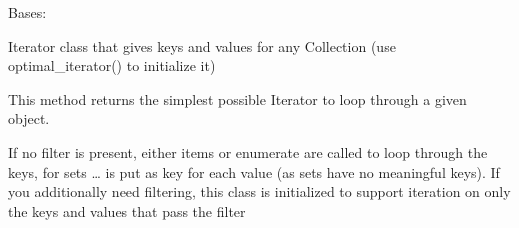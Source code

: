 \documentclass[a4paper,10pt,english]{sphinxmanual}
\begin{document}
\begin{fulllineitems}
\label{\detokenize{fagus.iterators:fagus.iterators.FilteredIterator}}
\pysigstartsignatures
{}
\pysigstopsignatures
\sphinxAtStartPar
Bases: 

\sphinxAtStartPar
Iterator class that gives keys and values for any Collection (use optimal\_iterator() to initialize it)

\begin{fulllineitems}
\label{\detokenize{fagus.iterators:fagus.iterators.FilteredIterator.optimal_iterator}}
\pysigstartsignatures
{}
\pysigstopsignatures
\sphinxAtStartPar
This method returns the simplest possible Iterator to loop through a given object.

\sphinxAtStartPar
If no filter is present, either items or enumerate are called to loop through the keys, for sets … is put
as key for each value (as sets have no meaningful keys). If you additionally need filtering, this class is
initialized to support iteration on only the keys and values that pass the filter


\end{fulllineitems}
\end{fulllineitems}
\end{document}
